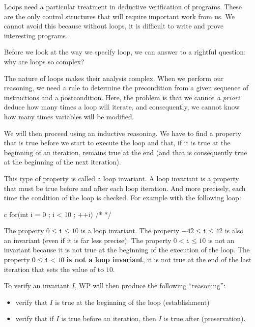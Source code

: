 Loops need a particular treatment in deductive verification of
programs. These are the only control structures that will require
important work from us. We cannot avoid this because without loops, it
is difficult to write and prove interesting programs.



Before we look at the way we specify loop, we can answer to a rightful
question: why are loops so complex?





The nature of loops makes their analysis complex. When we perform our
reasoning, we need a rule to determine the precondition from a given sequence
of instructions and a postcondition. Here, the problem is that we cannot
\emph{a priori} deduce how many times a loop will iterate, and consequently, we
cannot know how many times variables will be modified.



We will then proceed using an inductive reasoning. We have to find a
property that is true before we start to execute the loop and that, if
it is true at the beginning of an iteration, remains true at the end
(and that is consequently true at the beginning of the next iteration).



This type of property is called a loop invariant. A loop invariant is a
property that must be true before and after each loop iteration. And more
precisely, each time the condition of the loop is checked. For example with
the following loop:



\begin{CodeBlock}{c}
for(int i = 0 ; i < 10 ; ++i){ /* */ }
\end{CodeBlock}



The property $0 \leq \texttt{i} \leq 10$ is a loop invariant. The property
$-42 \leq \texttt{i} \leq 42$ is also an invariant (even if it is far less
precise). The property $0 < \texttt{i} \leq 10$ is not an invariant because it is
not true at the beginning of the execution of the loop. The property
$0 \leq \texttt{i} < 10$ \textbf{is not a loop invariant}, it is not true at the
end of the last iteration that sets the value of  to $10$.

To verify an invariant $I$, WP will then produce the following
``reasoning'':

\begin{itemize}
\item
  verify that $I$ is true at the beginning of the loop (establishment)
\item
  verify that if $I$ is true before an iteration, then $I$ is true
  after (preservation).
\end{itemize}

